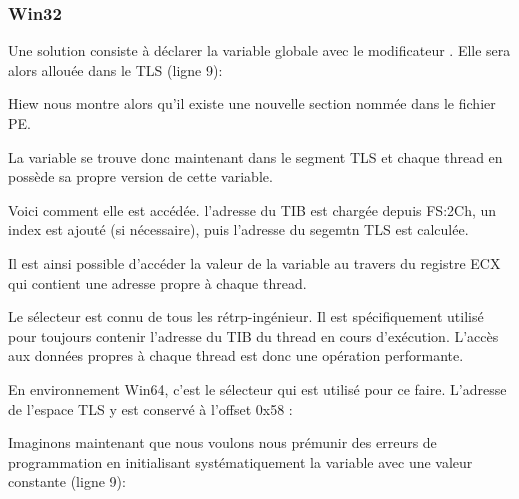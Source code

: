 ﻿\subsubsection{Win32}


Une solution consiste à déclarer la variable globale avec le modificateur .
Elle sera alors allouée dans le \ac{TLS} (ligne 9):



Hiew nous montre alors qu'il existe une nouvelle section nommée  dans le fichier PE.



La variable  se trouve donc maintenant dans le segment \ac{TLS} et chaque thread en
possède sa propre version de cette variable.

Voici comment elle est accédée. l'adresse du \ac{TIB} est chargée depuis FS:2Ch,
un index est ajouté (si nécessaire), puis l'adresse du segemtn \ac{TLS} est calculée.

Il est ainsi possible d'accéder la valeur de la variable  au travers du registre
ECX qui contient une adresse propre à chaque thread.


Le sélecteur  est connu de tous les rétrp-ingénieur. Il est spécifiquement utilisé pour
toujours contenir l'adresse du \ac{TIB} du thread en cours d'exécution. L'accès aux données propres
à chaque thread est donc une opération performante.


En environnement Win64, c'est le sélecteur  qui est utilisé pour ce faire. L'adresse de
l'espace \ac{TLS} y est conservé à l'offset 0x58 :




Imaginons maintenant que nous voulons nous prémunir des erreurs de programmation en initialisant
systématiquement la variable  avec une valeur constante (ligne 9):



